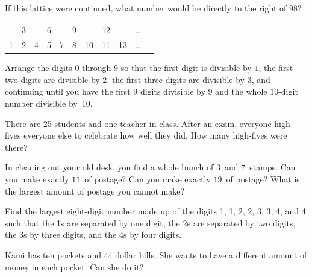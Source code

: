 \begin{problem}
If this lattice were continued, what number would be directly to the right of $98$?
\begin{center}
\begin{tabular}{c c c c c c c c c c c}
& 3 &  & 6 &  & 9 &  & 12 & &\ldots \\
1 & 2& 4&  5 & 7 & 8 & 10 & 11 & 13 & \ldots  \\
\end{tabular}
\end{center}

\end{problem}





\begin{problem}
Arrange the digits $0$ through $9$ so that the first digit is divisible by $1$, the first two digits are divisible by $2$, the first three digits are divisible by $3$, and continuing until you have the first $9$ digits divisible by $9$ and the whole $10$-digit number divisible by~$10$.
\end{problem}

\begin{problem}
There are 25 students and one teacher in class.  After an exam, everyone high-fives everyone else to celebrate how well they did.  How many high-fives were there?
\end{problem}




\begin{problem}
In cleaning out your old desk, you find a whole bunch of $3$\textcent\ and $7$\textcent\ stamps.  Can you make exactly $11$\textcent\ of postage?  Can you make exactly $19$\textcent\ of postage?  What is the largest amount of postage you cannot make?  
\end{problem}


\begin{problem}
Find the largest eight-digit number made up of the digits 1, 1, 2, 2, 3, 3, 4, and 4 such that the 1s are separated by one digit, the 2s are separated by two digits, the 3s by three digits, and the 4s by four digits.
\end{problem}



\begin{problem}
Kami has ten pockets and 44 dollar bills.  She wants to have a different amount of money in each pocket.  Can she do it?
\end{problem}


